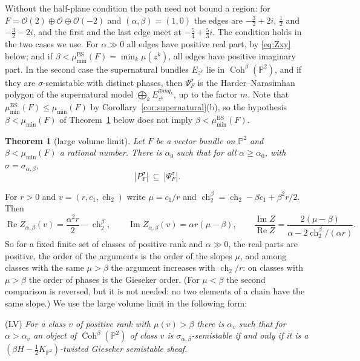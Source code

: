 \documentclass[11pt]{amsart}
\newtheorem{theorem}{Theorem}[section]
\theoremstyle{definition}
\theoremstyle{remark}
\newcommand{\PP}{\mathbb{P}}
\newcommand{\OO}{\mathcal{O}}
\newcommand{\BS}{\mathrm{BS}}
\begin{document}
Without the half-plane condition the path need not bound a region: for $F=\OO(2)\oplus\OO\oplus\OO(-2)$ and $(\alpha,\beta)=(1,0)$ the edges are $-\frac32+2i$, $\frac12$ and $-\frac32-2i$, and the first and the last edge meet at $-\frac54+\frac53i$. The condition holds in the two cases we use. For $\alpha\gg0$ all edges have positive real part, by \eqref{eq:Zxy} below; and if $\beta<\mu^\BS_{\min}(F)=\min_k\mu(z^k)$, all edges have positive imaginary part. In the second case the supernatural bundles $E_{z^k}$ lie in $\operatorname{Coh}^\beta(\PP^2)$, and if they are $\sigma$-semistable with distinct phases, then $\Psi^\sigma_F$ is the Harder--Narasimhan polygon of the supernatural model $\bigoplus_kE_{z^k}^{\oplus m q_k}$, up to the factor $m$. Note that $\mu^\BS_{\min}(F)\le\mu_{\min}(F)$ by Corollary~\ref{cor:supernatural}(b), so the hypothesis $\beta<\mu_{\min}(F)$ of Theorem~\ref{thm:lvl} below does not imply $\beta<\mu^\BS_{\min}(F)$.

\begin{theorem}[large volume limit]\label{thm:lvl}
Let $F$ be a vector bundle on $\PP^2$ and $\beta<\mu_{\min}(F)$ a rational number. There is $\alpha_0$ such that for all $\alpha\ge\alpha_0$, with $\sigma=\sigma_{\alpha,\beta}$,
\[
|P^\sigma_F|\ \subseteq\ |\Psi^\sigma_F| .
\]
\end{theorem}

For $r>0$ and $v=(r,c_1,\operatorname{ch}_2)$ write $\mu=c_1/r$ and $\operatorname{ch}_2^\beta=\operatorname{ch}_2-\beta c_1+\beta^2r/2$. Then
\begin{equation}\label{eq:Zxy}
\operatorname{Re}Z_{\alpha,\beta}(v)=\frac{\alpha^2r}2-\operatorname{ch}_2^\beta,\qquad
\operatorname{Im}Z_{\alpha,\beta}(v)=\alpha r(\mu-\beta),\qquad
\frac{\operatorname{Im}Z}{\operatorname{Re}Z}=\frac{2(\mu-\beta)}{\alpha-2\operatorname{ch}_2^\beta/(\alpha r)} .
\end{equation}
So for a fixed finite set of classes of positive rank and $\alpha\gg0$, the real parts are positive, the order of the arguments is the order of the slopes $\mu$, and among classes with the same $\mu>\beta$ the argument increases with $\operatorname{ch}_2/r$: on classes with $\mu>\beta$ the order of phases is the Gieseker order. (For $\mu<\beta$ the second comparison is reversed, but it is not needed: no two elements of a chain have the same slope.) We use the large volume limit in the following form:

\smallskip\noindent\textup{(LV)} \emph{For a class $v$ of positive rank with $\mu(v)>\beta$ there is $\alpha_v$ such that for $\alpha>\alpha_v$ an object of $\operatorname{Coh}^\beta(\PP^2)$ of class $v$ is $\sigma_{\alpha,\beta}$-semistable if and only if it is a $(\beta H-\frac12K_{\PP^2})$-twisted Gieseker semistable sheaf.}
\end{document}
